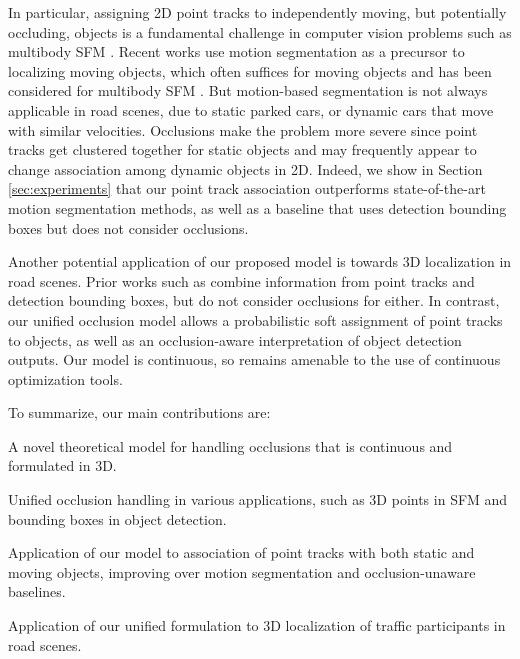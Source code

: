 In particular, assigning 2D point tracks to independently moving, but potentially occluding, objects is a fundamental challenge in computer vision problems such as multibody SFM \cite{Ozden_etal_2010}. Recent works use motion segmentation \cite{Rao_etal_2010,Brox_Malik_2010} as a precursor to localizing moving objects, which often suffices for moving objects \cite{Tron_Vidal_2007} and has been considered for multibody SFM \cite{Kundu_etal_2011}. But motion-based segmentation is not always applicable in road scenes, due to static parked cars, or dynamic cars that move with similar velocities. Occlusions make the problem more severe since point tracks get clustered together for static objects and may frequently appear to change association among dynamic objects in 2D.
Indeed, we show in Section \ref{sec:experiments} that our point track association outperforms state-of-the-art motion segmentation methods, as well as a baseline that uses detection bounding boxes but does not consider occlusions.

Another potential application of our proposed model is towards 3D localization in road scenes. Prior works such as \cite{Song_Chandraker_2014} combine information from point tracks and detection bounding boxes, but do not consider occlusions for either. In contrast, our unified occlusion model allows a probabilistic soft assignment of point tracks to objects, as well as an occlusion-aware interpretation of object detection outputs. Our model is continuous, so remains amenable to the use of continuous optimization tools.

To summarize, our main contributions are:
\vspace{-0.2cm}
\begin{tight_itemize}
\item A novel theoretical model for handling occlusions that is continuous and formulated in 3D.
\item Unified occlusion handling in various applications, such as 3D points in SFM and bounding boxes in object detection.
\item Application of our model to association of point tracks with both static and moving objects, improving over motion segmentation and occlusion-unaware baselines.
\item Application of our unified formulation to 3D localization of traffic participants in road scenes.
\end{tight_itemize}



